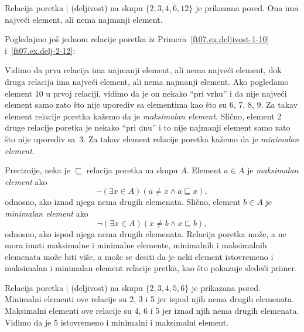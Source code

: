 \bigskip

\noindent
\begin{minipage}{3in}
  \hspace*{1.5em}Relacija poretka $|$ (deljivost) na skupu $\{2, 3, 4, 6, 12\}$ je prikazana pored. Ona ima najve\'ci element, ali
  nema najmanji element.
\end{minipage}
\hfill
\begin{minipage}{2.5in}
  \begin{center}
    
  \end{center}
\end{minipage}

\bigskip

Pogledajmo jo\v s jednom relacije poretka iz Primera~\ref{ft07.ex.deljivost-1-10} i~\ref{ft07.ex.delj-2-12}:
\begin{center}
    
    \hspace*{2cm}
    
\end{center}
Vidimo da prva relacija ima najmanji element, ali nema najve\'ci element, dok druga relacija ima najve\'ci element, ali nema
najmanji element. Ako pogledamo element 10 u prvoj relaciji, vidimo da je on nekako ``pri vrhu'' i da nije najve\'ci element samo
zato \v sto nije uporediv sa elementima kao \v sto su 6, 7, 8, 9. Za takav element relacije poretka ka\v zemo da je
\emph{maksimalan element}. Sli\v cno, element 2 druge relacije poretka je nekako ``pri dnu'' i to nije najmanji element
samo zato \v sto nije uporediv sa~3. Za takav element relacije poretka ka\v zemo da je \emph{minimalan element}.

Preciznije, neka je $\sqsubseteq$ relacija poretka na skupu $A$. Element $a \in A$ je \emph{maksimalan element} ako
$$
  \lnot(\exists x \in A)(a \ne x \land a \sqsubseteq x),
$$
odnosno, ako iznad njega nema drugih elemenata. Sli\v cno, element $b \in A$ je \emph{minimalan element} ako
$$
  \lnot(\exists x \in A)(x \ne b \land x \sqsubseteq b),
$$
odnosno, ako ispod njega nema drugih elemenata. Relacija poretka mo\v ze, a ne mora imati maksimalne i minimalne elemente,
minimalnih i maksimalnih elemenata mo\v ze biti vi\v se, a mo\v ze se desiti da je neki element istovremeno i maksimalan
i minimalan element relacije pretka, kao \v sto pokazuje slede\'ci primer.

\bigskip

\noindent
\begin{minipage}{3in}
  \begin{EX}
    Relacija poretka $|$ (deljivost) na skupu $\{2, 3, 4, 5, 6\}$ je prikazana pored. Minimalni elementi ove relacije
    su 2, 3 i 5 jer ispod njih nema drugih elemenata. Maksimalni elementi ove relacije su 4, 6 i 5 jer iznad njih nema
    drugih elemenata. Vidimo da je 5 istovremeno i minimalni i maksimalni element.
  \end{EX}
\end{minipage}
\hfill
\begin{minipage}{2.5in}
  \begin{center}
    
  \end{center}
\end{minipage}

